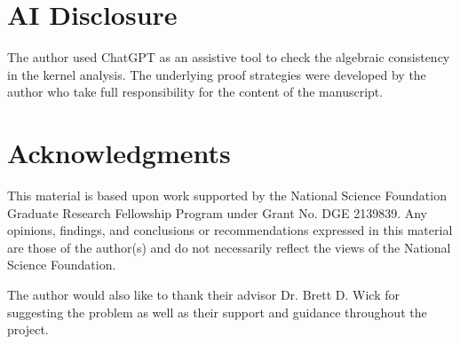 \documentclass{article}
\begin{document}
\section*{AI Disclosure}
The author used ChatGPT as an assistive tool to check the algebraic consistency in the kernel analysis. The underlying proof strategies were developed by the author who take full responsibility for the content of the manuscript.

\section*{Acknowledgments}

This material is based upon work supported by the National Science Foundation Graduate Research Fellowship Program under Grant No. DGE 2139839. Any opinions, findings, and conclusions or recommendations expressed in this material are those of the author(s) and do not necessarily reflect the views of the National Science Foundation.  

The author would also like to thank their advisor Dr. Brett D. Wick for suggesting the problem as well as their support and guidance throughout the project. 

 
\end{document}
